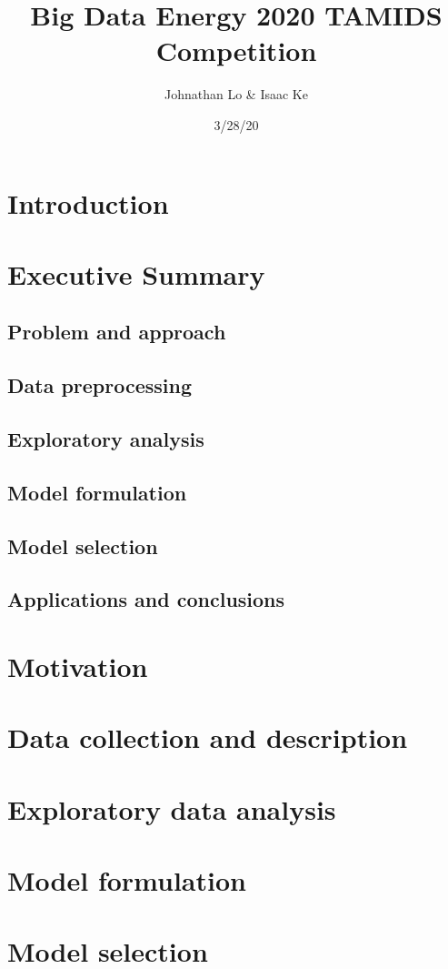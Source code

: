 \documentclass[12pt, a4paper]{book}
\title{Big Data Energy 2020 TAMIDS Competition}
\author{Johnathan Lo \& Isaac Ke}
\date{3/28/20}
\begin{document}
\maketitle
\tableofcontents
\chapter{Introduction}
\chapter{Executive Summary}
	\section{Problem and approach}
	\section{Data preprocessing}
	\section{Exploratory analysis}
	\section{Model formulation}
	\section{Model selection}
	\section{Applications and conclusions}
\chapter{Motivation}
\chapter{Data collection and description}
\chapter{Exploratory data analysis}
\chapter{Model formulation}
\chapter{Model selection}
\end{document}
